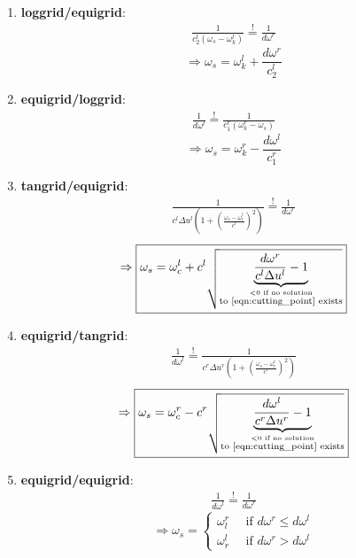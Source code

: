 \begin{enumerate}
	\item {\bf loggrid/equigrid}:
		\begin{align*}
			\frac{1}{c_2^l(\omega_s-\omega_k^l)}\stackrel{!}{=}\frac{1}{d\omega^r}
		\end{align*}
		\[
			\Rightarrow \boxed{\omega_s= \omega_k^l + \frac{d\omega^r}{c_2^l}}
		\]
	\item {\bf equigrid/loggrid}:
		\begin{align*}
			\frac{1}{d\omega^l}\stackrel{!}{=}\frac{1}{c_1^r(\omega_k^r-\omega_s)}
		\end{align*}
		\[
			\Rightarrow \boxed{\omega_s= \omega_k^r - \frac{d\omega^l}{c_1^r}}
		\]
	\item {\bf tangrid/equigrid}:
		\begin{align*}
			\frac{1}{c^l\Delta u^l\left(1+\left(\frac{\omega_s-\omega_c^l}{c^l}\right)^2\right)}\stackrel{!}{=}\frac{1}{d\omega^r}
		\end{align*}
		\[
			\Rightarrow \boxed{\omega_s= \omega_c^l + c^l \sqrt{\underbrace{\frac{d\omega^r}{c^l\Delta u^l} -1}_{\stackrel{<0 \text{ if no solution}}{\text{to \ref{eqn:cutting_point} exists} } }}}
		\]
	\item {\bf equigrid/tangrid}:
		\begin{align*}
			\frac{1}{d\omega^l}\stackrel{!}{=}\frac{1}{c^r\Delta u^r\left(1+\left(\frac{\omega_s-\omega_c^r}{c^r}\right)^2\right)}
		\end{align*}
		\[
			\Rightarrow \boxed{\omega_s= \omega_c^r - c^r \sqrt{\underbrace{\frac{d\omega^l}{c^r\Delta u^r} -1}_{\stackrel{<0 \text{ if no solution}}{\text{to \ref{eqn:cutting_point} exists} } }}}
		\]
	\item {\bf equigrid/equigrid}:
		\begin{align*}
			\frac{1}{d\omega^l}\stackrel{!}{=}\frac{1}{d\omega^r}
		\end{align*}
		\[
			\Rightarrow 
			\boxed{\omega_s= \begin{cases}
							\omega_l^r \quad \text{ if } d\omega^r \leq d\omega^l \\
							\omega_r^l \quad \text{ if } d\omega^r > d\omega^l
			                             \end{cases}
			}
		\]
\end{enumerate}


